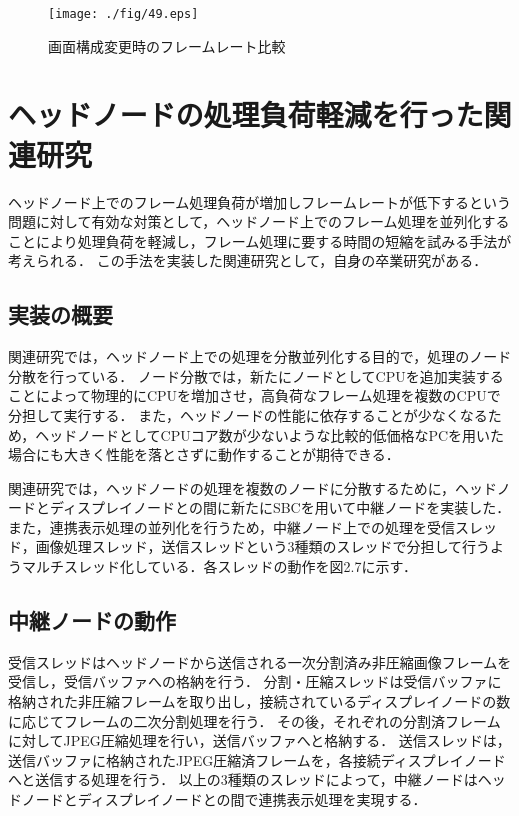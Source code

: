 \begin{figure}[H]
  \hspace*{\fill}
  \texttt{[image: ./fig/49.eps]}
  \hspace*{\fill}
  \label{fig_2.6}
  \caption{画面構成変更時のフレームレート比較}
 \end{figure}


 \section{ヘッドノードの処理負荷軽減を行った関連研究}
 
ヘッドノード上でのフレーム処理負荷が増加しフレームレートが低下するという問題に対して有効な対策として，ヘッドノード上でのフレーム処理を並列化することにより処理負荷を軽減し，フレーム処理に要する時間の短縮を試みる手法が考えられる．
この手法を実装した関連研究として，自身の卒業研究がある．

\subsection*{実装の概要}

関連研究では，ヘッドノード上での処理を分散並列化する目的で，処理のノード分散を行っている．
ノード分散では，新たにノードとしてCPUを追加実装することによって物理的にCPUを増加させ，高負荷なフレーム処理を複数のCPUで分担して実行する．
また，ヘッドノードの性能に依存することが少なくなるため，ヘッドノードとしてCPUコア数が少ないような比較的低価格なPCを用いた場合にも大きく性能を落とさずに動作することが期待できる．

関連研究では，ヘッドノードの処理を複数のノードに分散するために，ヘッドノードとディスプレイノードとの間に新たにSBCを用いて中継ノードを実装した．
また，連携表示処理の並列化を行うため，中継ノード上での処理を受信スレッド，画像処理スレッド，送信スレッドという3種類のスレッドで分担して行うようマルチスレッド化している．各スレッドの動作を図2.7に示す．

\subsection*{中継ノードの動作}
受信スレッドはヘッドノードから送信される一次分割済み非圧縮画像フレームを受信し，受信バッファへの格納を行う．
分割・圧縮スレッドは受信バッファに格納された非圧縮フレームを取り出し，接続されているディスプレイノードの数に応じてフレームの二次分割処理を行う．
その後，それぞれの分割済フレームに対してJPEG圧縮処理を行い，送信バッファへと格納する．
送信スレッドは，送信バッファに格納されたJPEG圧縮済フレームを，各接続ディスプレイノードへと送信する処理を行う．
以上の3種類のスレッドによって，中継ノードはヘッドノードとディスプレイノードとの間で連携表示処理を実現する．

